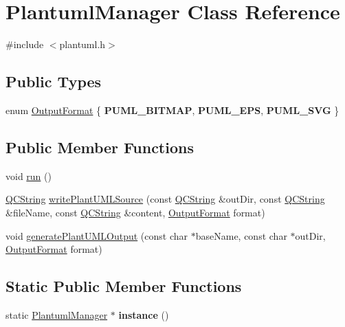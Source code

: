 \hypertarget{class_plantuml_manager}{}\section{Plantuml\+Manager Class Reference}
\label{class_plantuml_manager}


{\ttfamily \#include $<$plantuml.\+h$>$}

\subsection*{Public Types}
\begin{DoxyCompactItemize}
\item 
enum \mbox{\hyperlink{class_plantuml_manager_a73ccdfc6400a28af7d9d2f92215b9af5}{Output\+Format}} \{ {\bfseries P\+U\+M\+L\+\_\+\+B\+I\+T\+M\+AP}, 
{\bfseries P\+U\+M\+L\+\_\+\+E\+PS}, 
{\bfseries P\+U\+M\+L\+\_\+\+S\+VG}
 \}
\end{DoxyCompactItemize}
\subsection*{Public Member Functions}
\begin{DoxyCompactItemize}
\item 
void \mbox{\hyperlink{class_plantuml_manager_af38a83e442553a769951c724353cbe6a}{run}} ()
\item 
\mbox{\hyperlink{class_q_c_string}{Q\+C\+String}} \mbox{\hyperlink{class_plantuml_manager_aae9d6ca920f03f3496029fcb2ada08c8}{write\+Plant\+U\+M\+L\+Source}} (const \mbox{\hyperlink{class_q_c_string}{Q\+C\+String}} \&out\+Dir, const \mbox{\hyperlink{class_q_c_string}{Q\+C\+String}} \&file\+Name, const \mbox{\hyperlink{class_q_c_string}{Q\+C\+String}} \&content, \mbox{\hyperlink{class_plantuml_manager_a73ccdfc6400a28af7d9d2f92215b9af5}{Output\+Format}} format)
\item 
void \mbox{\hyperlink{class_plantuml_manager_ac7dc58177520721f3ac752f0f56abca0}{generate\+Plant\+U\+M\+L\+Output}} (const char $\ast$base\+Name, const char $\ast$out\+Dir, \mbox{\hyperlink{class_plantuml_manager_a73ccdfc6400a28af7d9d2f92215b9af5}{Output\+Format}} format)
\end{DoxyCompactItemize}
\subsection*{Static Public Member Functions}
\begin{DoxyCompactItemize}
\item 
\mbox{\label{class_plantuml_manager_a1fe46f597476759ae07a08c7d73e6500}} 
static \mbox{\hyperlink{class_plantuml_manager}{Plantuml\+Manager}} $\ast$ {\bfseries instance} ()
\end{DoxyCompactItemize}



